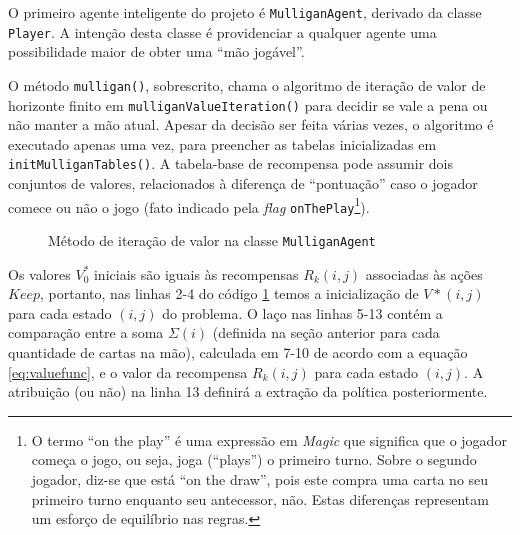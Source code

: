 O primeiro agente inteligente do projeto é \texttt{MulliganAgent}, derivado da classe \texttt{Player}. A intenção desta classe é providenciar a qualquer agente uma possibilidade maior de obter uma ``mão jogável''.



O método \texttt{mulligan()}, sobrescrito, chama o algoritmo de iteração de valor de horizonte finito em \texttt{mulliganValueIteration()} para decidir se vale a pena ou não manter a mão atual. Apesar da decisão ser feita várias vezes, o algoritmo é executado apenas uma vez, para preencher as tabelas inicializadas em \texttt{initMulliganTables()}. A tabela-base de recompensa pode assumir dois conjuntos de valores, relacionados à diferença de ``pontuação'' caso o jogador comece ou não o jogo (fato indicado pela \textit{flag} \texttt{onThePlay}\footnote{O termo ``on the play'' é uma expressão em \textit{Magic} que significa que o jogador começa o jogo, ou seja, joga (``plays'') o primeiro turno. Sobre o segundo jogador, diz-se que está ``on the draw'', pois este compra uma carta no seu primeiro turno enquanto seu antecessor, não. Estas diferenças representam um esforço de equilíbrio nas regras.}).
\begin{figure}[h!]
  
  \caption{Método de iteração de valor na classe \texttt{MulliganAgent}}
  \label{code:valueit}
\end{figure}

Os valores $V^*_0$ iniciais são iguais às recompensas $R_k(i,j)$ associadas às ações $Keep$, portanto, nas linhas 2-4 do código \ref{code:valueit} temos a inicialização de $V*(i, j)$ para cada estado $(i, j)$ do problema. O laço nas linhas 5-13 contém a comparação entre a soma $\Sigma(i)$ (definida na seção anterior para cada quantidade de cartas na mão), calculada em 7-10 de acordo com a equação \ref{eq:valuefunc}, e o valor da recompensa $R_k(i, j)$ para cada estado $(i, j)$. A atribuição (ou não) na linha 13 definirá a extração da política posteriormente.

\newpage


